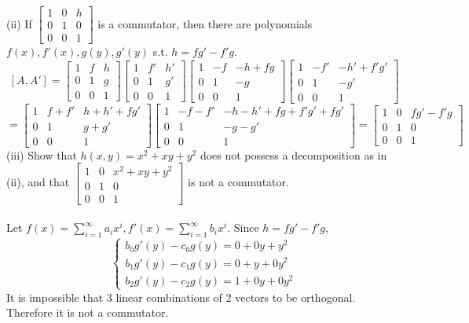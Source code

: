 \documentclass{article}
\begin{document}
\begin{siderules}
\color{blue}(ii) If \(\begin{bmatrix}1&0&h\\0&1&0\\0&0&1\end{bmatrix}\) is a commutator, then there are polynomials \(f(x),f'(x),g(y),g'(y)\) s.t. \(h=fg'-f'g\).\color{black}
\[[A,A']=\begin{bmatrix}1&f&h\\0&1&g\\0&0&1\end{bmatrix}\begin{bmatrix}1&f'&h'\\0&1&g'\\0&0&1\end{bmatrix}\begin{bmatrix}1&-f&-h+fg\\0&1&-g\\0&0&1\end{bmatrix}\begin{bmatrix}1&-f'&-h'+f'g'\\0&1&-g'\\0&0&1\end{bmatrix}\]
\[=\begin{bmatrix}1&f+f'&h+h'+fg'\\0&1&g+g'\\0&0&1\end{bmatrix}\begin{bmatrix}1&-f-f'&-h-h'+fg+f'g'+fg'\\0&1&-g-g'\\0&0&1\end{bmatrix}=\begin{bmatrix}1&0&fg'-f'g\\0&1&0\\0&0&1\end{bmatrix}\]
\color{blue}(iii) Show that \(h(x,y)=x^{2}+xy+y^{2}\) does not possess a decomposition as in \color{gray}(ii)\color{blue}, and that \(\begin{bmatrix}1&0&x^{2}+xy+y^{2}\\0&1&0\\0&0&1\end{bmatrix}\) is not a commutator.\color{black}\\\\
Let \(f(x)=\sum_{i=1}^{\infty}a_{i}x^{i},f'(x)=\sum_{i=1}^{\infty}b_{i}x^{i}\). Since \(h=fg'-f'g\), 
\[\begin{cases}b_{0}g'(y)-c_{0}g(y)=0+0y+y^{2}\\b_{1}g'(y)-c_{1}g(y)=0+y+0y^{2}\\b_{2}g'(y)-c_{2}g(y)=1+0y+0y^{2}\end{cases}\]
It is impossible that 3 linear combinations of 2 vectors to be orthogonal. Therefore it is not a commutator.
\end{siderules}
\end{document}
